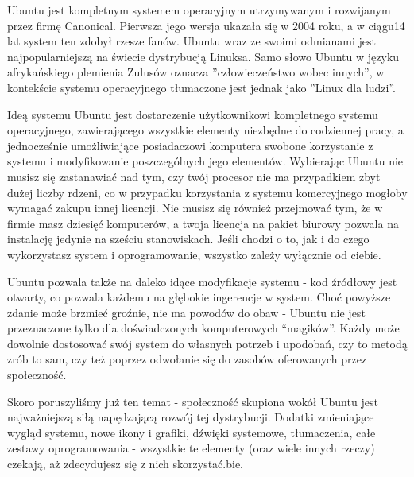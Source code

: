 Ubuntu jest kompletnym systemem operacyjnym utrzymywanym i rozwijanym przez firmę Canonical. Pierwsza jego wersja ukazała się w 2004 roku, a w ciągu14 lat system ten zdobył rzesze fanów. Ubuntu wraz ze swoimi odmianami jest najpopularniejszą na świecie dystrybucją Linuksa. Samo słowo Ubuntu w języku afrykańskiego plemienia Zulusów oznacza ”człowieczeństwo wobec innych”, w kontekście systemu operacyjnego tłumaczone jest jednak jako ”Linux dla ludzi”.

Ideą systemu Ubuntu jest dostarczenie użytkownikowi kompletnego systemu operacyjnego, zawierającego wszystkie elementy niezbędne do codziennej pracy, a jednocześnie umożliwiające posiadaczowi komputera swobone korzystanie z systemu i modyfikowanie poszczególnych jego elementów. Wybierając Ubuntu nie musisz się zastanawiać nad tym, czy twój procesor nie ma przypadkiem zbyt dużej liczby rdzeni, co w przypadku korzystania z systemu komercyjnego mogłoby wymagać zakupu innej licencji. Nie musisz się również przejmować tym, że w firmie masz dziesięć komputerów, a twoja licencja na pakiet biurowy pozwala na instalację jedynie na sześciu stanowiskach. Jeśli chodzi o to, jak i do czego wykorzystasz system i oprogramowanie, wszystko zależy wyłącznie od ciebie.

Ubuntu pozwala także na daleko idące modyfikacje systemu - kod źródłowy jest otwarty, co pozwala każdemu na głębokie ingerencje w system. Choć powyższe zdanie może brzmieć groźnie, nie ma powodów do obaw - Ubuntu nie jest przeznaczone tylko dla doświadczonych komputerowych “magików”. Każdy może dowolnie dostosować swój system do własnych potrzeb i upodobań, czy to metodą zrób to sam, czy też poprzez odwołanie się do zasobów oferowanych przez społeczność.

Skoro poruszyliśmy już ten temat - społeczność skupiona wokół Ubuntu jest najważniejszą siłą napędzającą rozwój tej dystrybucji. Dodatki zmieniające wygląd systemu, nowe ikony i grafiki, dźwięki systemowe, tłumaczenia, całe zestawy oprogramowania - wszystkie te elementy (oraz wiele innych rzeczy) czekają, aż zdecydujesz się z nich skorzystać.bie.
